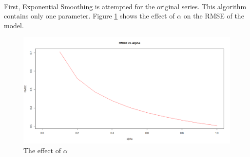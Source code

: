 \documentclass[12pt]{article}
\begin{document}
\paragraph{}
First, Exponential Smoothing is attempted for the original series. This algorithm contains only one parameter. Figure \ref{fig:figure18} shows the effect of $\alpha$ on the RMSE of the model.
\begin{figure}[H]
  \centering
  \includegraphics[width=\linewidth]{figure18.png}
  \caption{The effect of $\alpha$}
  \label{fig:figure18}
\end{figure}
\end{document}
